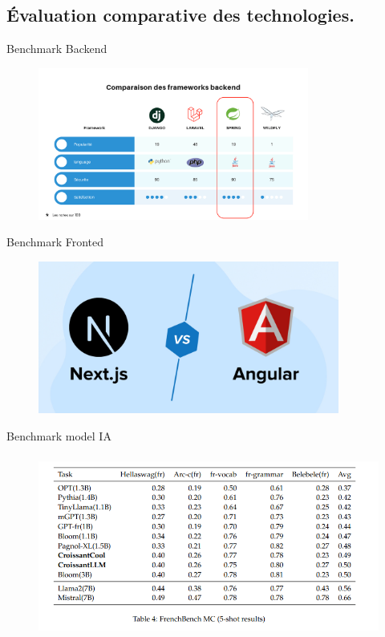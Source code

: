 \documentclass[aspectratio=169]{beamer}
\begin{document}
\subsection{Évaluation comparative des technologies.}
\begin{frame}{Benchmark Backend}
    \begin{figure}[htpb]
        \centering
        \includegraphics[height=5cm]{assets/images/benchmark.png}
    \end{figure}
\end{frame}

\begin{frame}{Benchmark Fronted}
    \begin{figure}[htpb]
        \centering
        \includegraphics[height=5cm]{assets/images/bench-next.jpg}
    \end{figure}
\end{frame}

\begin{frame}{Benchmark model IA}
    \begin{figure}[htpb]
        \centering
        \includegraphics[height=6cm]{assets/images/ia_benchmark.png}
    \end{figure}
\end{frame}
\end{document}
